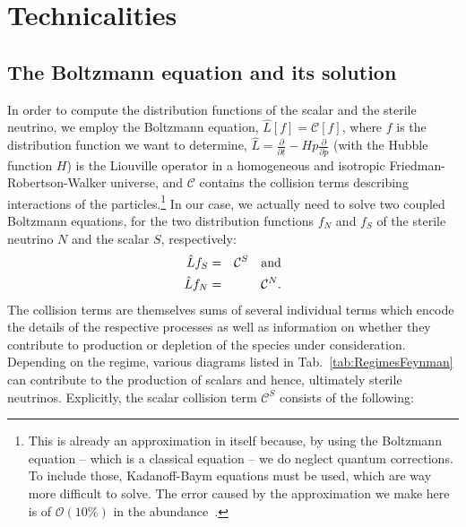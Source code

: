 \section{\label{sec:Technicalities}Technicalities}

\subsection{\label{sec:Technicalities:BoltzmannEquation}The Boltzmann equation and its solution}

In order to compute the distribution functions of the scalar and the sterile neutrino, we employ the Boltzmann equation, $\hat{L}[f]=\mathcal{C}[f]$, where $f$ is the distribution function we want to determine, $\hat{L} = \frac{\partial}{\partial t} - H p \frac{\partial}{\partial p}$ (with the Hubble function $H$) is the Liouville operator in a homogeneous and isotropic Friedman-Robertson-Walker universe, and $\mathcal{C}$ contains the collision terms describing interactions of the particles.\footnote{This is already an approximation in itself because, by using the Boltzmann equation -- which is a classical equation -- we do neglect quantum corrections. To include those, Kadanoff-Baym equations must be used, which are way more difficult to solve. The error caused by the approximation we make here is of $\mathcal{O}(10\%)$ in the abundance~\cite{Hamaguchi:2011jy}.} In our case, we actually need to solve two coupled Boltzmann equations, for the two distribution functions $f_N$ and $f_S$ of the sterile neutrino $N$ and the scalar $S$, respectively:
\begin{eqnarray}
 \hat{L}f_S &=& \mathcal{C}^S \label{eq:Boltzmann_Scalar}\ \ \ {\rm and}\\
 \hat{L} f_N &=& \mathcal{C}^N. \label{eq:Boltzmann_Neutrino}
\end{eqnarray}
The collision terms are themselves sums of several individual terms which encode the details of the respective processes as well as information on whether they contribute to production or depletion of the species under consideration. Depending on the regime, various diagrams listed in Tab.~\ref{tab:RegimesFeynman} can contribute to the production of scalars and hence, ultimately sterile neutrinos. Explicitly, the scalar collision term $\mathcal{C}^S$ consists of the following:
